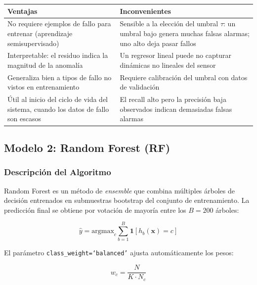 \documentclass[12pt,a4paper]{article}
\begin{document}
\begin{center}
\begin{tabular}{p{6cm}p{6cm}}
\toprule
\textbf{Ventajas} & \textbf{Inconvenientes} \\
\midrule
No requiere ejemplos de fallo para entrenar (aprendizaje semisupervisado) &
Sensible a la elecci\'{o}n del umbral $\tau$: un umbral bajo genera muchas
falsas alarmas; uno alto deja pasar fallos \\
\addlinespace
Interpretable: el residuo indica la magnitud de la anomal\'{i}a &
Un regresor lineal puede no capturar din\'{a}micas no lineales del sensor \\
\addlinespace
Generaliza bien a tipos de fallo no vistos en entrenamiento &
Requiere calibraci\'{o}n del umbral con datos de validaci\'{o}n \\
\addlinespace
\'{U}til al inicio del ciclo de vida del sistema, cuando los datos de fallo son escasos &
El recall alto pero la precisi\'{o}n baja observados indican demasiadas falsas alarmas \\
\bottomrule
\end{tabular}
\end{center}

\subsection{Modelo 2: Random Forest (RF)}

\subsubsection{Descripci\'{o}n del Algoritmo}

Random Forest es un m\'{e}todo de \textit{ensemble} que combina m\'{u}ltiples \'{a}rboles de
decisi\'{o}n entrenados en submuestras bootstrap del conjunto de entrenamiento. La
predicci\'{o}n final se obtiene por votaci\'{o}n de mayor\'{i}a entre los $B = 200$ \'{a}rboles:

\begin{equation}
  \hat{y} = \text{argmax}_c \sum_{b=1}^{B} \mathbf{1}[h_b(\mathbf{x}) = c]
\end{equation}

El par\'{a}metro \texttt{class\_weight=`balanced'} ajusta autom\'{a}ticamente los pesos:

\begin{equation}
  w_c = \frac{N}{K \cdot N_c}
\end{equation}
\end{document}
